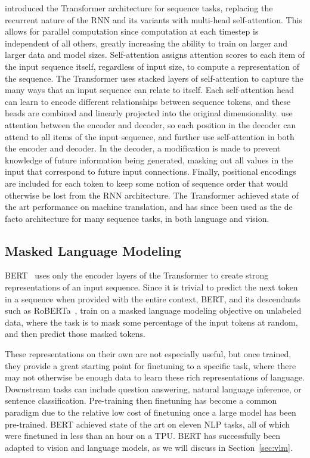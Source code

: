 \citet{vaswani2017attention} introduced the Transformer architecture for
sequence tasks, replacing the recurrent nature of the RNN and its variants with
multi-head self-attention. This allows for parallel computation since
computation at each timestep is independent of all others, greatly increasing
the ability to train on larger and larger data and model sizes. Self-attention
assigns attention scores to each item of the input sequence itself, regardless
of input size, to compute a representation of the sequence. The Transformer
uses stacked layers of self-attention to capture the many ways that an input
sequence can relate to itself. Each self-attention head can learn to encode
different relationships between sequence tokens, and these heads are combined
and linearly projected into the original dimensionality.
\citet{vaswani2017attention} use attention between the encoder and decoder, so
each position in the decoder can attend to all items of the input sequence, and
further use self-attention in both the encoder and decoder. In the decoder, a
modification is made to prevent knowledge of future information being
generated, masking out all values in the input that correspond to future input
connections. Finally, positional encodings are included for each token to keep
some notion of sequence order that would otherwise be lost from the RNN
architecture. The Transformer achieved state of the art performance on machine
translation, and has since been used as the de facto architecture for many
sequence tasks, in both language and vision.

\subsection{Masked Language Modeling}
\label{ssec:mlm}

BERT~\cite{devlin2019bert} uses only the encoder layers of the Transformer to
create strong representations of an input sequence. Since it is trivial to
predict the next token in a sequence when provided with the entire context,
BERT, and its descendants such as RoBERTa~\citep{liu2020roberta}, train on a
masked language modeling objective on unlabeled data, where the task is to mask
some percentage of the input tokens at random, and then predict those masked
tokens.

These representations on their own are not especially useful, but once trained,
they provide a great starting point for finetuning to a specific task, where
there may not otherwise be enough data to learn these rich representations of
language. Downstream tasks can include question answering, natural language
inference, or sentence classification. Pre-training then finetuning has become
a common paradigm due to the relative low cost of finetuning once a large model
has been pre-trained. BERT achieved state of the art on eleven NLP tasks, all
of which were finetuned in less than an hour on a TPU. BERT has successfully
been adapted to vision and language models, as we will discuss in
Section~\ref{sec:vlm}.


